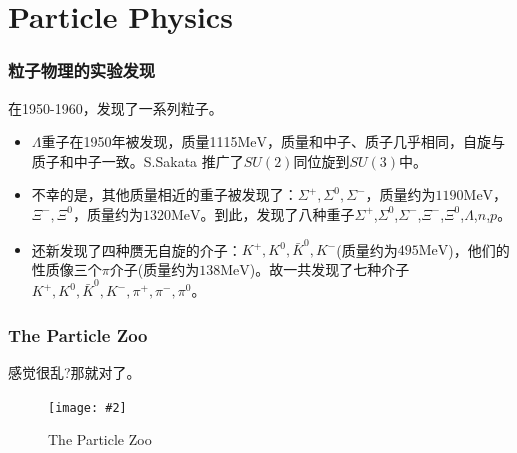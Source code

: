 \documentclass[CJK]{beamer}
\newcommand{\cpic}[2]{
\begin{center}
\texttt{[image: \#2]}
\end{center}
}
\newcommand{\cpicn}[3]
{
\begin{figure}[h!]
\cpic{#1}{#2}
\caption{#3\label{#2}}
\end{figure}
}
\begin{document}
\section{Particle Physics}
\begin{frame}\frametitle{\bch 粒子物理的实验发现\ech}
  \bch
  在1950-1960，发现了一系列粒子。
  \begin{itemize}
  \item $\Lambda$重子在1950年被发现，质量1115$\mathrm{MeV}$，质量和中子、质子几乎相同，自旋与质子和中子一致。S.Sakata 推广了$SU(2)$同位旋到$SU(3)$中。
  \item 不幸的是，其他质量相近的重子被发现了：$\Sigma^{+},\Sigma^0,\Sigma^-$，质量约为$1190\mathrm{MeV}$，$\Xi^-,\Xi^0$，质量约为$1320\mathrm{MeV}$。到此，发现了八种重子$\Sigma^{+}$,$\Sigma^0$,$\Sigma^-$,$\Xi^-$,$\Xi^0$,$\Lambda$,$n$,$p$。
    \item 还新发现了四种赝无自旋的介子：$K^+,K^0,\bar{K}^0,K^-$(质量约为$495\mathrm{MeV}$)，他们的性质像三个$\pi$介子(质量约为$138\mathrm{MeV}$)。故一共发现了七种介子$K^+,K^0,\bar{K}^0,K^-,\pi^+,\pi^-,\pi^0$。
  \end{itemize}
  \ech
\end{frame}
\begin{frame}\frametitle{The Particle Zoo}
  \bch
  感觉很乱?那就对了。
  \cpicn{0.25}{zoo}{The Particle Zoo}
  \ech
\end{frame}
\end{document}
